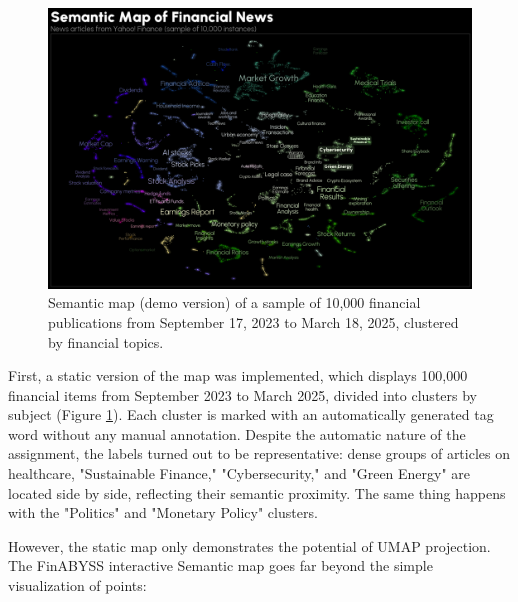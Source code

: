 \begin{figure}[H]
    \centering
    \includegraphics[width=1\linewidth]{img/semantic_map.png}
    \caption{Semantic map (demo version) of a sample of 10,000 financial publications
    from September 17, 2023 to March 18, 2025, clustered by financial topics.}
    \label{fig:semantic_map}
\end{figure}

First, a static version of the map was implemented, which displays 100,000 financial items from September 2023
to March 2025, divided into clusters by subject (Figure \ref{fig:semantic_map}). Each cluster is marked
with an automatically generated tag word without any manual annotation. Despite the automatic nature
of the assignment, the labels turned out to be representative: dense groups of articles on healthcare,
"Sustainable Finance," "Cybersecurity," and "Green Energy" are located side by side, reflecting their semantic
proximity. The same thing happens with the "Politics" and "Monetary Policy" clusters.

However, the static map only demonstrates the potential of UMAP projection. The FinABYSS interactive Semantic
map goes far beyond the simple visualization of points:

